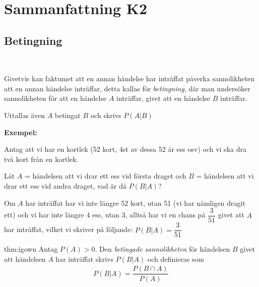 \section{Sammanfattning K2}
\subsection{Betingning}\hfill\\\par
\noindent Givetvis kan faktumet att en annan händelse har inträffat påverka sannolikheten att en annan händelse inträffar, detta kallas för \textit{betingning}, där man undersöker sannolikheten för att en händelse $A$ inträffar, givet att en händelse $B$ inträffar.\par
\noindent Uttallas även $A$ betingat $B$ och skrivs $P(A|B)$
\par\bigskip
\noindent\textbf{Exempel:}\par
\noindent Antag att vi har en kortlek (52 kort, 4st av dessa 52 är ess osv) och vi ska dra två kort från en kortlek. \par
\noindent Låt $A$ = händelsen att vi drar ett ess vid första draget och $B$ = händelsen att vi drar ett ess vid andra draget, vad är då $P(B|A)$?
\par\bigskip
\noindent Om $A$ har inträffat har vi inte längre 52 kort, utan 51 (vi har nämligen dragit ett) och vi har inte längre 4 ess, utan 3, alltså har vi en chans på $\dfrac{3}{51}$ givet att $A$ har inträffat, vilket vi skriver på följande: $P(B|A) = \dfrac{3}{51}$
\par\bigskip
\begin{theo}{thm:igown}
  Antag $P(A)>0$. Den \textit{betingade sannolikheten} för händelsen $B$ givet att händelsen $A$ har inträffat skrivs $P(B|A)$ och definieras som
  \begin{equation*}
    \begin{gathered}
      P(B|A) = \dfrac{P(B\cap A)}{P(A)}
    \end{gathered}
  \end{equation*}
\end{theo}
